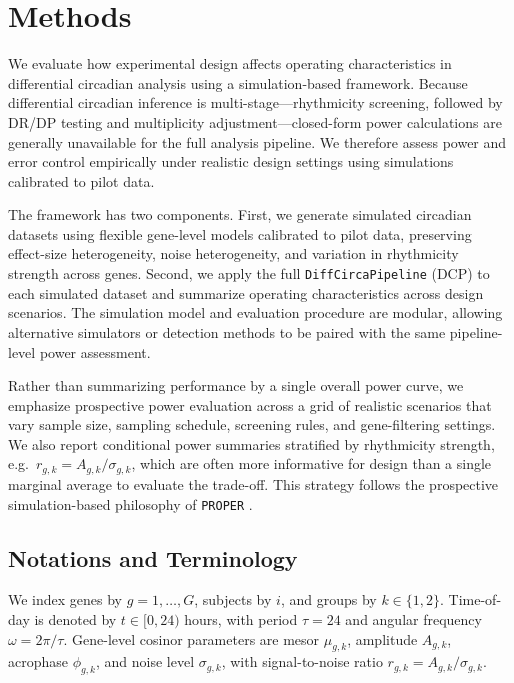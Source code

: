 \documentclass{article}
\newcommand{\software}[1]{\texttt{#1}}
\begin{document}
\section{Methods}

We evaluate how experimental design affects operating characteristics in
differential circadian analysis using a simulation-based framework. Because
differential circadian inference is multi-stage---rhythmicity screening,
followed by DR/DP testing and multiplicity adjustment---closed-form power
calculations are generally unavailable for the full analysis pipeline. We
therefore assess power and error control empirically under realistic design
settings using simulations calibrated to pilot data.

The framework has two components. First, we generate simulated circadian
datasets using flexible gene-level models calibrated to pilot data, preserving
effect-size heterogeneity, noise heterogeneity, and variation in rhythmicity
strength across genes. Second, we apply the full
\software{DiffCircaPipeline} (DCP) to each simulated dataset and summarize
operating characteristics across design scenarios. The simulation model and
evaluation procedure are modular, allowing alternative simulators or detection
methods to be paired with the same pipeline-level power assessment.

Rather than summarizing performance by a single overall power curve, we
emphasize prospective power evaluation across a grid of realistic scenarios
that vary sample size, sampling schedule, screening rules, and gene-filtering
settings. We also report conditional power summaries stratified by rhythmicity
strength, e.g.\ $r_{g,k}=A_{g,k}/\sigma_{g,k}$, which are often more
informative for design than a single marginal average to evaluate the trade-off. This strategy follows
the prospective simulation-based philosophy of \software{PROPER}
\cite{wu2015proper}.

\subsection{Notations and Terminology}
\label{sec:notation}

We index genes by $g=1,\ldots,G$, subjects by $i$, and groups by
$k\in\{1,2\}$. Time-of-day is denoted by $t\in[0,24)$ hours, with period
$\tau=24$ and angular frequency $\omega=2\pi/\tau$. Gene-level cosinor
parameters are mesor $\mu_{g,k}$, amplitude $A_{g,k}$, acrophase
$\phi_{g,k}$, and noise level $\sigma_{g,k}$, with signal-to-noise ratio
$r_{g,k}=A_{g,k}/\sigma_{g,k}$.
\end{document}
